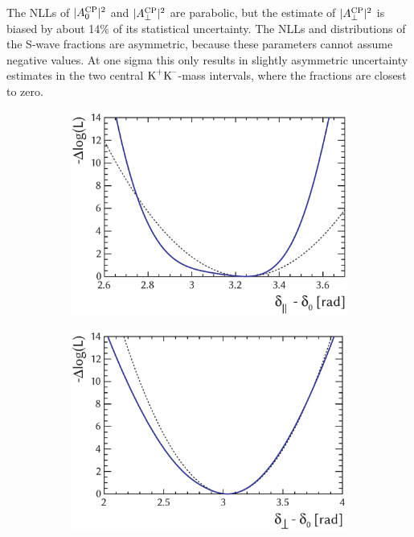 The NLLs of $|A_{\text{0}}^{\text{CP}}|^2$ and $|A_{\perp}^{\text{CP}}|^2$ are parabolic, but the estimate of $|A_{\perp}^{\text{CP}}|^2$ is biased by about 14\% of its statistical
uncertainty. The NLLs and distributions of the S-wave fractions are asymmetric, because these parameters cannot assume negative values. At
one sigma this only results in slightly asymmetric uncertainty estimates in the two central $\text{K}^\text{+}\text{K}^\text{--}$-mass intervals, where the
fractions are closest to zero.

\begin{figure}[tbp]
  \centering
  \begin{subfigure}{0.49\textwidth}
    \includegraphics[width=\textwidth]{graphics/results/NLL_polarDep_AparPhase}
    \caption{}
  \end{subfigure}
  \hfill%
  \begin{subfigure}{0.49\textwidth}
    \includegraphics[width=\textwidth]{graphics/results/NLL_polarDep_AperpPhase}
    \caption{}
  \end{subfigure}


\end{figure}
